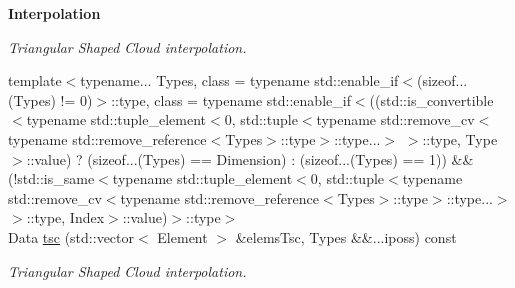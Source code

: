 \begin{Indent}{\bf Interpolation}
\begin{DoxyCompactItemize}
\begin{DoxyCompactList}\small\item\em Triangular Shaped Cloud interpolation. \end{DoxyCompactList}\item 
{\footnotesize template$<$typename... Types, class  = typename std\-::enable\-\_\-if$<$(sizeof...(\-Types) != 0)$>$\-::type, class  = typename std\-::enable\-\_\-if$<$((std\-::is\-\_\-convertible$<$typename std\-::tuple\-\_\-element$<$0, std\-::tuple$<$typename std\-::remove\-\_\-cv$<$typename std\-::remove\-\_\-reference$<$\-Types$>$\-::type$>$\-::type...$>$ $>$\-::type, Type$>$\-::value) ? (sizeof...(\-Types) == Dimension) \-: (sizeof...(\-Types) == 1)) \&\& (!std\-::is\-\_\-same$<$typename std\-::tuple\-\_\-element$<$0, std\-::tuple$<$typename std\-::remove\-\_\-cv$<$typename std\-::remove\-\_\-reference$<$\-Types$>$\-::type$>$\-::type...$>$ $>$\-::type, Index$>$\-::value)$>$\-::type$>$ }\\Data \hyperlink{exceptionmagrathea_1_1SimpleHyperOctree_ab57456687e1ba820e3d314ddec489133}{tsc} (std\-::vector$<$ Element $>$ \&elems\-Tsc, Types \&\&...iposs) const 
\begin{DoxyCompactList}\small\item\em Triangular Shaped Cloud interpolation. \end{DoxyCompactList}\end{DoxyCompactItemize}
\end{Indent}

